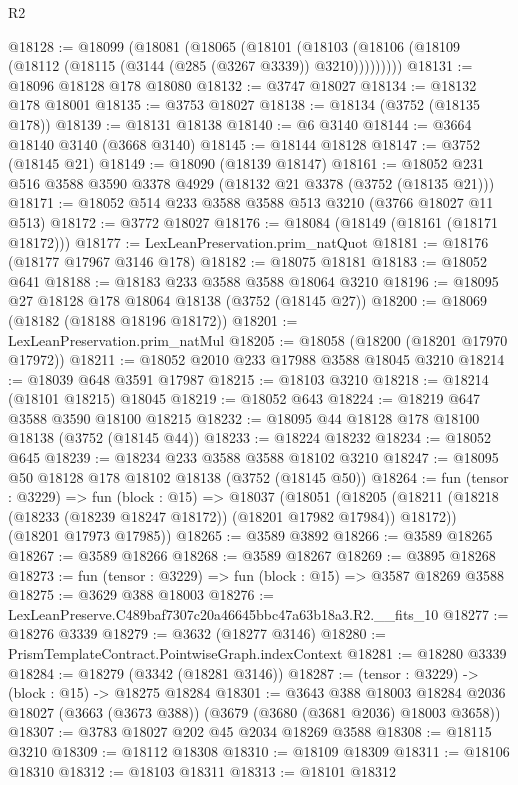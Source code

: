 \begin{lexlean}{R2}
\begin{coremodule}
@18128 := @18099
    (@18081
      (@18065
        (@18101 (@18103 (@18106 (@18109 (@18112 (@18115 (@3144 (@285 (@3267 @3339)) @3210)))))))))
@18131 := @18096 @18128 @178 @18080
@18132 := @3747 @18027
@18134 := @18132 @178 @18001
@18135 := @3753 @18027
@18138 := @18134 (@3752 (@18135 @178))
@18139 := @18131 @18138
@18140 := @6 @3140
@18144 := @3664 @18140 @3140 (@3668 @3140)
@18145 := @18144 @18128
@18147 := @3752 (@18145 @21)
@18149 := @18090 (@18139 @18147)
@18161 := @18052 @231 @516 @3588 @3590 @3378 @4929 (@18132 @21 @3378 (@3752 (@18135 @21)))
@18171 := @18052 @514 @233 @3588 @3588 @513 @3210 (@3766 @18027 @11 @513)
@18172 := @3772 @18027
@18176 := @18084 (@18149 (@18161 (@18171 @18172)))
@18177 := LexLeanPreservation.prim_natQuot
@18181 := @18176 (@18177 @17967 @3146 @178)
@18182 := @18075 @18181
@18183 := @18052 @641
@18188 := @18183 @233 @3588 @3588 @18064 @3210
@18196 := @18095 @27 @18128 @178 @18064 @18138 (@3752 (@18145 @27))
@18200 := @18069 (@18182 (@18188 @18196 @18172))
@18201 := LexLeanPreservation.prim_natMul
@18205 := @18058 (@18200 (@18201 @17970 @17972))
@18211 := @18052 @2010 @233 @17988 @3588 @18045 @3210
@18214 := @18039 @648 @3591 @17987
@18215 := @18103 @3210
@18218 := @18214 (@18101 @18215) @18045
@18219 := @18052 @643
@18224 := @18219 @647 @3588 @3590 @18100 @18215
@18232 := @18095 @44 @18128 @178 @18100 @18138 (@3752 (@18145 @44))
@18233 := @18224 @18232
@18234 := @18052 @645
@18239 := @18234 @233 @3588 @3588 @18102 @3210
@18247 := @18095 @50 @18128 @178 @18102 @18138 (@3752 (@18145 @50))
@18264 := fun (tensor : @3229) =>
  fun (block : @15) =>
  @18037
    (@18051
      (@18205 (@18211 (@18218 (@18233 (@18239 @18247 @18172)) (@18201 @17982 @17984)) @18172))
      (@18201 @17973 @17985))
@18265 := @3589 @3892
@18266 := @3589 @18265
@18267 := @3589 @18266
@18268 := @3589 @18267
@18269 := @3895 @18268
@18273 := fun (tensor : @3229) => fun (block : @15) => @3587 @18269 @3588
@18275 := @3629 @388 @18003
@18276 := LexLeanPreserve.C489baf7307c20a46645bbc47a63b18a3.R2.__fits_10
@18277 := @18276 @3339
@18279 := @3632 (@18277 @3146)
@18280 := PrismTemplateContract.PointwiseGraph.indexContext
@18281 := @18280 @3339
@18284 := @18279 (@3342 (@18281 @3146))
@18287 := (tensor : @3229) -> (block : @15) -> @18275 @18284
@18301 := @3643
    @388
    @18003
    @18284
    @2036
    @18027
    (@3663 (@3673 @388))
    (@3679 (@3680 (@3681 @2036) @18003 @3658))
@18307 := @3783 @18027 @202 @45 @2034 @18269 @3588
@18308 := @18115 @3210
@18309 := @18112 @18308
@18310 := @18109 @18309
@18311 := @18106 @18310
@18312 := @18103 @18311
@18313 := @18101 @18312

\end{coremodule}
\end{lexlean}
